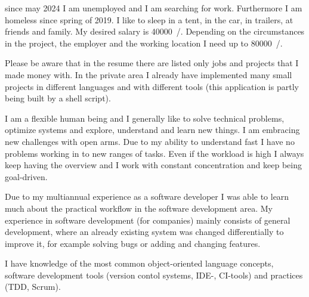 \documentclass[fromphone,parskip=half]{scrlttr2}%
\newcommand\versionLanguageStart{}
\newcommand\versionLanguageEnd{}
\begin{document}
	\begin{letter}%
	{
		\addressReceiver
	}
		\opening{\joinList{\dear}{\genderReceiver}{\surnameReceiver}{,}}
\versionLanguageStart%
		since may 2024 I am unemployed and I am searching for work.
		Furthermore I am homeless since spring of 2019.
		I like to sleep in a tent, in the car, in trailers, at friends and family.
		My desired salary is \SI{40000}{\sieuro/\year}.
		Depending on the circumstances in the project, the employer and the working location I need up to \SI{80000}{\sieuro/\year}.
\versionLanguageEnd
		
		
\versionLanguageStart%
		Please be aware that in the resume there are listed only jobs and projects that I made money with.
		In the private area I already have implemented many small projects in different languages and with different tools (this application is partly being built by a shell script).
\versionLanguageEnd

\versionLanguageStart%
		I am a flexible human being and I generally like to solve technical problems, optimize systems and explore, understand and learn new things.
		I am embracing new challenges with open arms.
		Due to my ability to understand fast I have no problems working in to new ranges of tasks.
		Even if the workload is high I always keep having the overview and I work with constant concentration and keep being goal-driven.
\versionLanguageEnd
		
\versionLanguageStart%
		Due to my multiannual experience as a software developer I was able to learn much about the practical workflow in the software development area.
		My experience in software development (for companies) mainly consists of general development, where an already existing system was changed differentially to improve it, for example solving bugs or adding and changing features.
\versionLanguageEnd

\versionLanguageStart%
		I have knowledge of the most common object-oriented language concepts, software development tools (version contol systems, IDE-, CI-tools) and practices (TDD, Scrum).
\versionLanguageEnd

%
%		
		

\end{letter}
\end{document}
